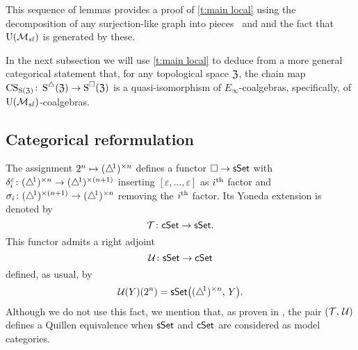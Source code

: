 This sequence of lemmas provides a proof of \cref{t:main local} using the decomposition of any surjection-like graph into pieces \coproduct \ and \product and the fact that ${\operatorname{U}(\mathcal{M}_{sl})}$ is generated by these.

In the next subsection we will use \cref{t:main local} to deduce from a more general categorical statement that, for any topological space $\mathfrak{Z}$, the chain map $\operatorname{CS}_{\operatorname{S}(\mathfrak{Z})} \colon \operatorname{\operatorname{S}^{\triangle}}(\mathfrak{Z}) \to \operatorname{\operatorname{S}^{\square}}(\mathfrak{Z})$ is a quasi-isomorphism of $E_\infty$-coalgebras, specifically, of ${\operatorname{U}(\mathcal{M}_{sl})}$-coalgebras.

\subsection{Categorical reformulation}

The assignment $2^n \mapsto (\triangle^{\!1})^{\times n}$ defines a functor $\square \to \mathsf{sSet}$ with $\delta_i^\varepsilon \colon (\triangle^{\!1})^{\times n} \to (\triangle^{\!1})^{\times (n+1)}$ inserting $[\varepsilon, \dots, \varepsilon]$ as $i^{\mathrm{th}}$ factor and $\sigma_i \colon (\triangle^{\!1})^{\times (n+1)} \to (\triangle^{\!1})^{\times n}$ removing the $i^{\mathrm{th}}$ factor.
Its Yoneda extension is denoted by
\[
\operatorname{\mathcal{T}} \colon \mathsf{cSet} \to \mathsf{sSet}.
\]
This functor admits a right adjoint
\[
\operatorname{\mathcal{U}} \colon \mathsf{sSet} \to \mathsf{cSet}
\]
defined, as usual, by
\[
\operatorname{\mathcal{U}}(Y)(2^n) = \mathsf{sSet} \big( (\triangle^{\!1})^{\times n}, \, Y \big).
\]
Although we do not use this fact, we mention that, as proven in \cite[\S 8.4.30]{cisinski2006presheaves}, the pair $(\operatorname{\mathcal{T}},\, \operatorname{\mathcal{U}})$ defines a Quillen equivalence when $\mathsf{sSet}$ and $\mathsf{cSet}$ are considered as model categories.

%
%
%
%

